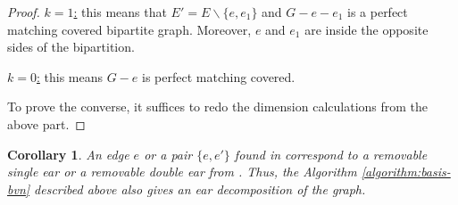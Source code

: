 \documentclass[11pt]{article}
\newcommand{\1}{\mathbf{1}}
\newcommand{\0}{\mathbf{0}}
\newtheorem{CO}[theorem]{Corollary}
\begin{document}
\begin{proof}
    \underline{$k=1$:} this means that $E'=E\backslash\{e, e_1\}$ and $G-e-e_1$ is a perfect matching covered bipartite graph. Moreover, $e$ and $e_1$ are inside the opposite sides of the bipartition.

    \underline{$k=0$:} this means $G-e$ is perfect matching covered.

    To prove the converse, it suffices to redo the dimension calculations from the above part.
\end{proof}

\begin{CO}
    An edge $e$ or a pair $\{e,e'\}$ found in  correspond to a removable single ear or a removable double ear from . Thus, the Algorithm \ref{algorithm:basis-bvn} described above also gives an ear decomposition of the graph.
\end{CO}
\end{document}
